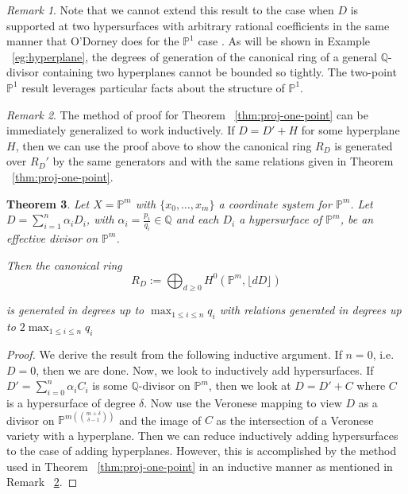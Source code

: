\documentclass{amsart}
\theoremstyle{plain}
\newtheorem{thm}{Theorem}[section]
\theoremstyle{definition}
\theoremstyle{remark}
\newtheorem{rem}[thm]{Remark}
\numberwithin{equation}{section}
\newcommand\bq{{\mathbb Q}}
\newcommand\bp{{\mathbb P}}
\newcommand\pdeg{\delta}
\begin{document}
\begin{rem}
\label{rem:proj-two-points}
Note that we cannot extend this result to the case when
$D$ is supported at two hypersurfaces with arbitrary rational
coefficients in the same manner that O'Dorney does for the
$\bp^1$ case \cite[Section 4]{dorney:canonical}. As will be shown
in Example ~\ref{eg:hyperplane}, the degrees of generation of the
canonical ring of a general $\bq$-divisor containing two
hyperplanes cannot be bounded so tightly. The two-point
$\bp^1$ result leverages particular facts about the structure of
$\bp^1$.
\end{rem}

\begin{rem}
\label{rem:proj-one-point-ind}
The method of proof for Theorem ~\ref{thm:proj-one-point}
can be immediately generalized to work inductively. If $D = D' + H$
for some hyperplane $H$, then we can use the proof above to show
the canonical ring $R_D$ is generated over $R_D'$ by the same
generators and with the same relations given in Theorem
~\ref{thm:proj-one-point}.
\end{rem}

\begin{thm}
\label{thm:proj-effective}
Let $X = \bp^m$ with $\{x_0, \ldots, x_m\}$ a coordinate system for
$\bp^m$. Let $D = \sum_{i = 1}^{n} \alpha_i D_i$, with $\alpha_i =
\frac{p_i}{q_i} \in \bq$ and each $D_i$ a hypersurface of
$\bp^m$, be an effective divisor on $\bp^m$.

Then the canonical ring
\[
	R_D := \bigoplus_{d \geq 0} H^0(\bp^m, \lfloor dD \rfloor)
\]

\noindent
is generated in degrees up to $\max_{1 \leq i \leq n}{q_i}$ with
relations generated in degrees up to $2 \max_{1 \leq i \leq n}{q_i}$
\end{thm}

\begin{proof}
We derive the result from the following inductive argument.
If $n = 0$, i.e.~ $D = 0$, then we are done.
Now, we look to inductively add hypersurfaces.
If $D' = \sum_{i = 0}^{n} \alpha_i C_i$ is some $\bq$-divisor
on $\bp^m$, then we look at $D = D' + C$ where $C$ is a
hypersurface of degree $\pdeg$. Now use the Veronese mapping
to view $D$ as a divisor on $\bp^{m ({m + \pdeg} \choose \pdeg - 1)}$
and the image of $C$ as the intersection of a Veronese variety
with a hyperplane. Then we can reduce inductively adding hypersurfaces
to the case of adding hyperplanes. However, this is accomplished
by the method used in Theorem ~\ref{thm:proj-one-point} in an
inductive manner as mentioned in Remark ~\ref{rem:proj-one-point-ind}.
\end{proof}
\end{document}
